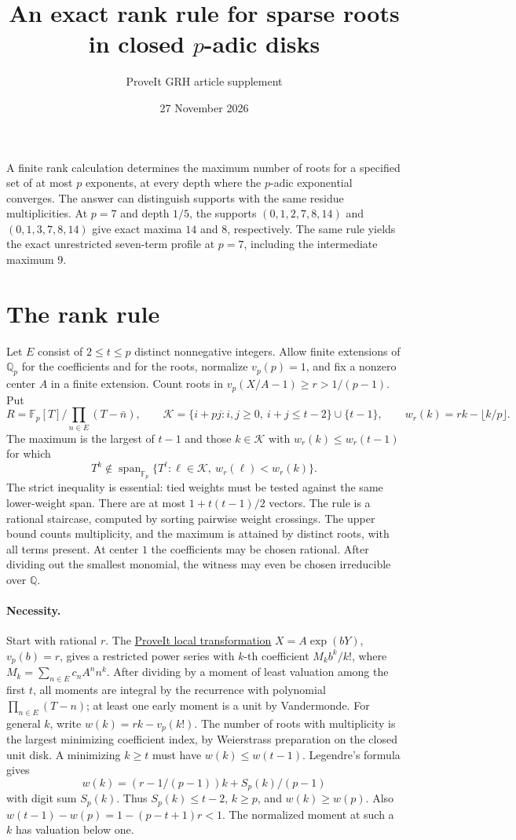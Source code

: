 \documentclass[11pt]{article}
\title{\vspace{-1.5em}An exact rank rule for sparse roots\\ in closed \(p\)-adic disks}
\author{ProveIt GRH article supplement}
\date{27 November 2026}
\newcommand{\F}{\mathbb F}
\newcommand{\Q}{\mathbb Q}
\begin{document}
\maketitle

A finite rank calculation determines the maximum number of roots
for a specified set of at most \(p\) exponents, at every depth where
the \(p\)-adic exponential converges. The answer can distinguish
supports with the same residue multiplicities. At \(p=7\) and
depth \(1/5\), the supports \((0,1,2,7,8,14)\) and \((0,1,3,7,8,14)\)
give exact maxima \(14\) and \(8\), respectively.
The same rule yields the exact unrestricted seven-term profile
at \(p=7\), including the intermediate maximum \(9\).

\section{The rank rule}
Let \(E\) consist of \(2\le t\le p\) distinct nonnegative integers.
Allow finite extensions of \(\Q_p\) for the coefficients and for the
roots, normalize \(v_p(p)=1\), and fix a nonzero center \(A\) in a
finite extension. Count roots in \(v_p(X/A-1)\ge r>1/(p-1)\).
Put
\[
 R=\F_p[T]/\prod_{n\in E}(T-\bar n),\qquad
 \mathcal K=\{i+pj:i,j\ge0,\ i+j\le t-2\}\cup\{t-1\},
 \qquad w_r(k)=rk-\lfloor k/p\rfloor .
\]
The maximum is the largest of \(t-1\) and those \(k\in\mathcal K\)
with \(w_r(k)\le w_r(t-1)\) for which
\[
 T^k\notin \operatorname{span}_{\F_p}\{T^\ell:
       \ell\in\mathcal K,\ w_r(\ell)<w_r(k)\}.
 \tag{1}
\]
The strict inequality is essential: tied weights must be tested
against the same lower-weight span. There are at most
\(1+t(t-1)/2\) vectors. The rule is a rational staircase, computed
by sorting pairwise weight crossings. The upper bound counts
multiplicity, and the maximum is attained by distinct roots,
with all terms present. At center \(1\) the coefficients may be
chosen rational. After dividing out the smallest monomial, the
witness may even be chosen irreducible over \(\Q\).

\paragraph{Necessity.}
Start with rational \(r\). The
\href{https://github.com/VladimirReshetnikov/ProveIt/blob/dd990b27a22290c756c1bd4adce1d971bf7e7821/Analysis/GeneralizedRiemannHypothesis/Article/sections/smd.tex#L57}{ProveIt local transformation}
\(X=A\exp(bY)\), \(v_p(b)=r\), gives a restricted power series
with \(k\)-th coefficient \(M_k b^k/k!\), where
\(M_k=\sum_{n\in E}c_n A^n n^k\). After dividing by a moment of
least valuation among the first \(t\), all moments are integral by
the recurrence with polynomial \(\prod_{n\in E}(T-n)\);
at least one early moment is a unit by Vandermonde.
For general \(k\), write \(w(k)=rk-v_p(k!)\).
The number of roots with multiplicity is the largest minimizing
coefficient index, by Weierstrass preparation on the closed unit disk.
\newpage
A minimizing \(k\ge t\) must have \(w(k)\le w(t-1)\).
Legendre's formula gives
\[
 w(k)=(r-1/(p-1))k+S_p(k)/(p-1)
\]
with digit sum \(S_p(k)\). Thus \(S_p(k)\le t-2\), \(k\ge p\),
and \(w(k)\ge w(p)\). Also \(w(t-1)-w(p)=1-(p-t+1)r<1\).
The normalized moment at such a \(k\) has valuation below one.
\end{document}
